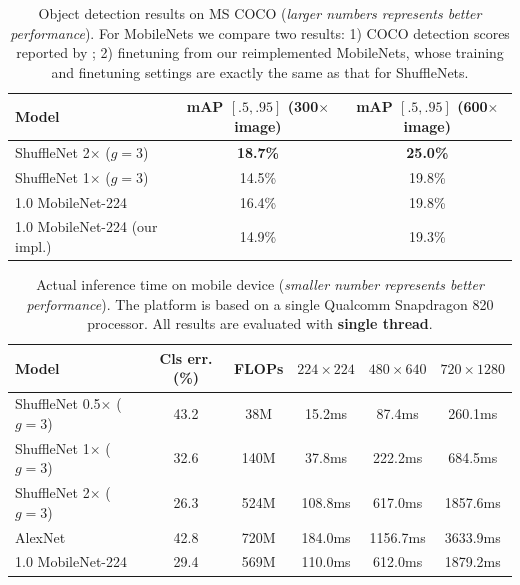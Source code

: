 \documentclass[10pt,twocolumn,letterpaper]{article}
\begin{document}
\begin{table}[h]
	\begin{center}
		\begin{tabular}{l|c|c}
			\hline
			Model & mAP $[.5,.95]$ (300$\times$ image) &mAP $[.5,.95]$ (600$\times$ image) \\
			\hline\hline
			ShuffleNet 2$\times$ ($g=3$) & \textbf{18.7\%} & \textbf{25.0\%} \\
			ShuffleNet 1$\times$ ($g=3$) & 14.5\% & 19.8\% \\
			\hline
			1.0 MobileNet-224~\cite{howard2017mobilenets} & 16.4\% & 19.8\% \\
			1.0 MobileNet-224 (our impl.) & 14.9\% & 19.3\% \\
			\hline 
		\end{tabular}
	\end{center}
	\caption{ Object detection results on MS COCO (\emph{larger numbers represents better performance}). For MobileNets we compare two results: 1) COCO detection scores reported by \cite{howard2017mobilenets}; 2) finetuning from our reimplemented MobileNets, whose training and finetuning settings are exactly the same as that for ShuffleNets. }
	\label{tbl:det}
\end{table}


\begin{table}[!ht]
	\begin{center}
		\begin{tabular}{l|c|c|c|c|c}
			\hline
			Model & Cls err. (\%) & FLOPs & $224\times 224$ & $480\times 640$ & $720\times 1280$ \\
			\hline\hline
			ShuffleNet 0.5$\times$ ($g=3$) & 43.2 & 38M & 15.2ms & 87.4ms & 260.1ms \\
			ShuffleNet 1$\times$ ($g=3$) & 32.6 & 140M & 37.8ms & 222.2ms & 684.5ms \\
			ShuffleNet 2$\times$ ($g=3$) & 26.3 & 524M & 108.8ms & 617.0ms & 1857.6ms \\
			\hline
			AlexNet~\cite{krizhevsky2012imagenet} & 42.8 & 720M & 184.0ms & 1156.7ms & 3633.9ms \\
			1.0 MobileNet-224~\cite{howard2017mobilenets} & 29.4 & 569M & 110.0ms & 612.0ms & 1879.2ms \\
			\hline 
		\end{tabular}
	\end{center}
	\caption{ Actual inference time on mobile device (\emph{smaller number represents better performance}). The platform is based on a single Qualcomm Snapdragon 820 processor. All results are evaluated with \textbf{single thread}. }
	\label{tbl:actual}
\end{table}
\end{document}
